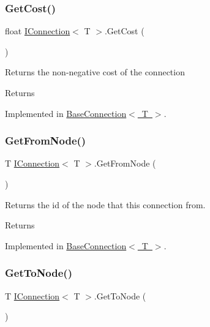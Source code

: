 \subsubsection{\texorpdfstring{Get\+Cost()}{GetCost()}}
{\footnotesize\ttfamily float \mbox{\hyperlink{interface_i_connection}{I\+Connection}}$<$ T $>$.Get\+Cost (\begin{DoxyParamCaption}{ }\end{DoxyParamCaption})}



Returns the non-\/negative cost of the connection 

\begin{DoxyReturn}{Returns}

\end{DoxyReturn}


Implemented in \mbox{\hyperlink{class_base_connection_a3f2351e9bf997450cca8f64e1e32337a}{Base\+Connection$<$ T $>$}}.

\mbox{\label{interface_i_connection_acecfce42b26af8f2f83e3a806edc6910}} 
\subsubsection{\texorpdfstring{Get\+From\+Node()}{GetFromNode()}}
{\footnotesize\ttfamily T \mbox{\hyperlink{interface_i_connection}{I\+Connection}}$<$ T $>$.Get\+From\+Node (\begin{DoxyParamCaption}{ }\end{DoxyParamCaption})}



Returns the id of the node that this connection from. 

\begin{DoxyReturn}{Returns}

\end{DoxyReturn}


Implemented in \mbox{\hyperlink{class_base_connection_a45f52b2a297e6ac3a1bca5b5b0d80b89}{Base\+Connection$<$ T $>$}}.

\mbox{\label{interface_i_connection_a738b6e5b2c2620e9e4a8a3e07fe85b52}} 
\subsubsection{\texorpdfstring{Get\+To\+Node()}{GetToNode()}}
{\footnotesize\ttfamily T \mbox{\hyperlink{interface_i_connection}{I\+Connection}}$<$ T $>$.Get\+To\+Node (\begin{DoxyParamCaption}{ }\end{DoxyParamCaption})}



